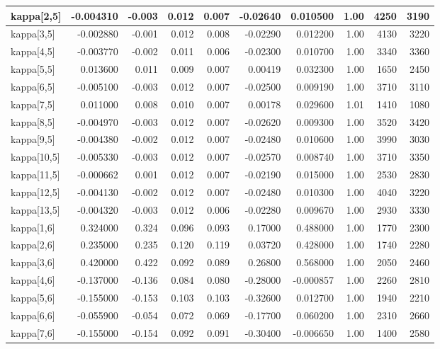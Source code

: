 \documentclass[
]{article}
\begin{document}
\begin{longtable*}[t]{l|r|r|r|r|r|r|r|r|r}
\hline
kappa[2,5] & -0.004310 & -0.003 & 0.012 & 0.007 & -0.02640 & 0.010500 & 1.00 & 4250 & 3190\\
\hline
kappa[3,5] & -0.002880 & -0.001 & 0.012 & 0.008 & -0.02290 & 0.012200 & 1.00 & 4130 & 3220\\
\hline
kappa[4,5] & -0.003770 & -0.002 & 0.011 & 0.006 & -0.02300 & 0.010700 & 1.00 & 3340 & 3360\\
\hline
kappa[5,5] & 0.013600 & 0.011 & 0.009 & 0.007 & 0.00419 & 0.032300 & 1.00 & 1650 & 2450\\
\hline
kappa[6,5] & -0.005100 & -0.003 & 0.012 & 0.007 & -0.02500 & 0.009190 & 1.00 & 3710 & 3110\\
\hline
kappa[7,5] & 0.011000 & 0.008 & 0.010 & 0.007 & 0.00178 & 0.029600 & 1.01 & 1410 & 1080\\
\hline
kappa[8,5] & -0.004970 & -0.003 & 0.012 & 0.007 & -0.02620 & 0.009300 & 1.00 & 3520 & 3420\\
\hline
kappa[9,5] & -0.004380 & -0.002 & 0.012 & 0.007 & -0.02480 & 0.010600 & 1.00 & 3990 & 3030\\
\hline
kappa[10,5] & -0.005330 & -0.003 & 0.012 & 0.007 & -0.02570 & 0.008740 & 1.00 & 3710 & 3350\\
\hline
kappa[11,5] & -0.000662 & 0.001 & 0.012 & 0.007 & -0.02190 & 0.015000 & 1.00 & 2530 & 2830\\
\hline
kappa[12,5] & -0.004130 & -0.002 & 0.012 & 0.007 & -0.02480 & 0.010300 & 1.00 & 4040 & 3220\\
\hline
kappa[13,5] & -0.004320 & -0.003 & 0.012 & 0.006 & -0.02280 & 0.009670 & 1.00 & 2930 & 3330\\
\hline
kappa[1,6] & 0.324000 & 0.324 & 0.096 & 0.093 & 0.17000 & 0.488000 & 1.00 & 1770 & 2300\\
\hline
kappa[2,6] & 0.235000 & 0.235 & 0.120 & 0.119 & 0.03720 & 0.428000 & 1.00 & 1740 & 2280\\
\hline
kappa[3,6] & 0.420000 & 0.422 & 0.092 & 0.089 & 0.26800 & 0.568000 & 1.00 & 2050 & 2460\\
\hline
kappa[4,6] & -0.137000 & -0.136 & 0.084 & 0.080 & -0.28000 & -0.000857 & 1.00 & 2260 & 2810\\
\hline
kappa[5,6] & -0.155000 & -0.153 & 0.103 & 0.103 & -0.32600 & 0.012700 & 1.00 & 1940 & 2210\\
\hline
kappa[6,6] & -0.055900 & -0.054 & 0.072 & 0.069 & -0.17700 & 0.060200 & 1.00 & 2310 & 2660\\
\hline
kappa[7,6] & -0.155000 & -0.154 & 0.092 & 0.091 & -0.30400 & -0.006650 & 1.00 & 1400 & 2580\\

\end{longtable*}
\end{document}
